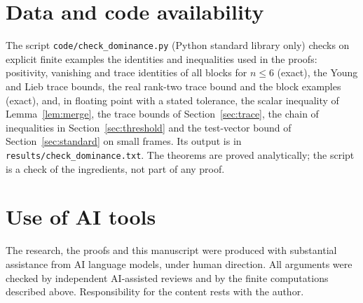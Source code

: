 \documentclass[11pt,a4paper]{article}
\theoremstyle{remark}
\begin{document}
\section*{Data and code availability}
The script \texttt{code/check\_dominance.py} (Python standard library only) checks on explicit finite examples the identities and inequalities used in the proofs: positivity, vanishing and trace identities of all blocks for $n\le6$ (exact), the Young and Lieb trace bounds, the real rank-two trace bound and the block examples (exact), and, in floating point with a stated tolerance, the scalar inequality of Lemma~\ref{lem:merge}, the trace bounds of Section~\ref{sec:trace}, the chain of inequalities in Section~\ref{sec:threshold} and the test-vector bound of Section~\ref{sec:standard} on small frames. Its output is in \texttt{results/check\_dominance.txt}. The theorems are proved analytically; the script is a check of the ingredients, not part of any proof.

\section*{Use of AI tools}
The research, the proofs and this manuscript were produced with substantial assistance from AI language models, under human direction. All arguments were checked by independent AI-assisted reviews and by the finite computations described above. Responsibility for the content rests with the author.
\end{document}
